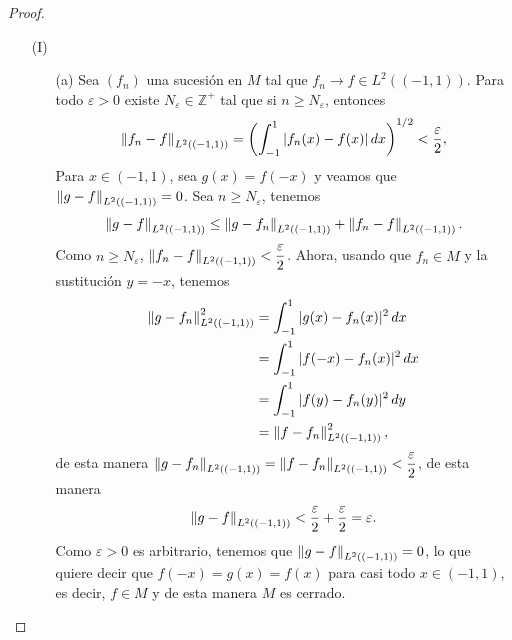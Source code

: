     \begin{proof}
    \begin{enumerate}
        \item[(I)] 
        \begin{enumerate}
            \item[(a)] Sea $(f_n)$ una sucesión en $M$ tal que $f_n\to f\in L^2((-1,1))$. Para todo $\varepsilon>0$ existe $N_\varepsilon\in \mathbb{Z}^+$ tal que si $n\geq N_\varepsilon$, entonces
            \begin{align*}
                \left\|f_n-f\right\|_{L^2((-1,1))}=\left(\int_{-1}^1 |f_n(x)-f(x)|\, dx\right)^{1/2}<\dfrac{\varepsilon}{2},
            \end{align*}
            Para $x \in (-1,1)$, sea $g(x)=f(-x)$ y veamos que $\left\|g-f\right\|_{L^2((-1,1))}=0$. Sea $n\geq N_\varepsilon$, tenemos
            \begin{align*}
                \left\|g-f\right\|_{L^2((-1,1))}\leq \left\|g-f_n\right\|_{L^2((-1,1))}+\left\|f_n-f\right\|_{L^2((-1,1))}.
            \end{align*}
            Como $n\geq N_\varepsilon$, $\left\|f_n-f\right\|_{L^2((-1,1))}<\dfrac{\varepsilon}{2}$. Ahora, usando que $f_n\in M$ y la sustitución $y=-x$, tenemos
        \begin{align*}
            \left\|g-f_n\right\|_{L^2((-1,1))}^2&=\int_{-1}^1|g(x)-f_n(x)|^2\, dx\\
            &=\int_{-1}^1|f(-x)-f_n(x)|^2\, dx\\
            &=\int_{-1}^1|f(y)-f_n(y)|^2\, dy\\
            &=\left\|f-f_n\right\|_{L^2((-1,1))}^2,
        \end{align*}
        de esta manera $\left\|g-f_n\right\|_{L^2((-1,1))}=\left\|f-f_n\right\|_{L^2((-1,1))}<\dfrac{\varepsilon}{2}$, de esta manera
        \begin{align*}
            \left\|g-f\right\|_{L^2((-1,1))}<\dfrac{\varepsilon}{2}+\dfrac{\varepsilon}{2}=\varepsilon.
        \end{align*}
        Como $\varepsilon>0$ es arbitrario, tenemos que $\left\|g-f\right\|_{L^2((-1,1))}=0$, lo que quiere decir que $f(-x)=g(x)=f(x)$ para casi todo $x \in (-1,1)$, es decir, $f \in M$ y de esta manera $M$ es cerrado.
        

\end{enumerate}
\end{enumerate}
\end{proof}
